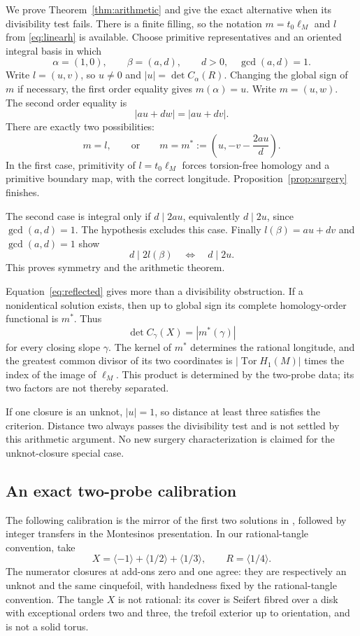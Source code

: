 \documentclass[11pt]{amsart}
\theoremstyle{definition}
\theoremstyle{remark}
\newcommand{\Tor}{\operatorname{Tor}}
\newcommand{\Det}{\operatorname{det}}
\newcommand{\cl}[2]{C_{#1}(#2)}
\newcommand{\tang}[1]{\langle #1\rangle}
\begin{document}
We prove Theorem~\ref{thm:arithmetic}
and give the exact alternative
when its divisibility test fails.
There is a finite filling, so
the notation \(m=t_0\ell_M\)
and \(l\) from \eqref{eq:linearh}
is available. Choose primitive
representatives and an oriented
integral basis in which
\[
 \alpha=(1,0),\qquad
 \beta=(a,d),\qquad d>0,\quad
 \gcd(a,d)=1.
\]
Write \(l=(u,v)\), so \(u\ne0\)
and \(|u|=\Det\cl\alpha R\).
Changing the global sign of \(m\)
if necessary, the first order
equality gives \(m(\alpha)=u\).
Write \(m=(u,w)\). The second
order equality is
\[
 |au+dw|=|au+dv|.
\]
There are exactly two possibilities:
\begin{equation}\label{eq:reflected}
 m=l,\qquad\text{or}\qquad
 m=m^*:=\left(u,-v-\frac{2au}{d}\right).
\end{equation}
In the first case, primitivity of
\(l=t_0\ell_M\) forces torsion-free
homology and a primitive boundary
map, with the correct longitude.
Proposition~\ref{prop:surgery}
finishes.

The second case is integral only
if \(d\mid2au\), equivalently
\(d\mid2u\), since \(\gcd(a,d)=1\).
The hypothesis excludes this case.
Finally \(l(\beta)=au+dv\) and
\(\gcd(a,d)=1\) show
\[
 d\mid2l(\beta)\quad\Longleftrightarrow\quad
 d\mid2u.
\]
This proves symmetry and the
arithmetic theorem.

Equation~\eqref{eq:reflected} gives
more than a divisibility obstruction.
If a nonidentical solution exists,
then up to global sign its complete
homology-order functional is
\(m^*\). Thus
\[
 \Det\cl\gamma X=|m^*(\gamma)|
\]
for every closing slope \(\gamma\).
The kernel of \(m^*\) determines
the rational longitude, and the
greatest common divisor of its
two coordinates is
\(|\Tor H_1(M)|\) times the index
of the image of \(\ell_M\).
This product is determined by the
two-probe data; its two factors
are not thereby separated.

If one closure is an unknot,
\(|u|=1\), so distance at least
three satisfies the criterion.
Distance two always passes the
divisibility test and is not
settled by this arithmetic
argument. No new surgery
characterization is claimed for
the unknot-closure special case.

\subsection{An exact two-probe calibration}\label{subsec:ES}

The following calibration is the mirror of the first two solutions
in \cite[Example~3, pp.~33--34]{ES1999}, followed by integer
transfers in the Montesinos presentation. In our rational-tangle
convention, take
\[
 X=\tang{-1}+\tang{1/2}+\tang{1/3},
 \qquad R=\tang{1/4}.
\]
The numerator closures at add-ons
zero and one agree: they are
respectively an unknot and the
same cinquefoil, with handedness
fixed by the rational-tangle
convention. The tangle \(X\)
is not rational: its cover is
Seifert fibred over a disk with
exceptional orders two and three,
the trefoil exterior up to
orientation, and is not a solid
torus.
\end{document}
